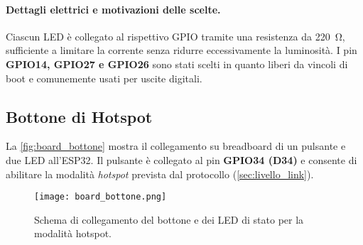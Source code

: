 \begin{table}[H]
  \centering
  \label{tab:led_pins}
  \caption{Mappatura hardware dei pin di uscita dell’ESP32 verso i LED di stato.}
\end{table}

\paragraph{Dettagli elettrici e motivazioni delle scelte.}
Ciascun LED è collegato al rispettivo GPIO tramite una resistenza da \SI{220}{\ohm}, sufficiente a limitare la corrente senza ridurre eccessivamente la luminosità.  
I pin \textbf{GPIO14, GPIO27 e GPIO26} sono stati scelti in quanto liberi da vincoli di boot e comunemente usati per uscite digitali.  

\newpage
\subsection{Bottone di Hotspot}
\label{subsec:button_hotspot}

La \autoref{fig:board_bottone} mostra il collegamento su breadboard di un pulsante e due LED all’ESP32.  
Il pulsante è collegato al pin \textbf{GPIO34 (D34)} e consente di abilitare la modalità \textit{hotspot} prevista dal protocollo (\autoref{sec:livello_link}).  

\begin{figure}[H]
  \centering
  \texttt{[image: board\_bottone.png]}
  \caption{Schema di collegamento del bottone e dei LED di stato per la modalità hotspot.}
  \label{fig:board_bottone}
\end{figure}

